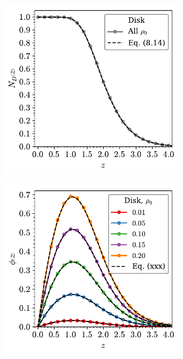 \begin{figure}
     \begin{subfigure}[b]{0.48\textwidth}
         \centering
         \includegraphics[width=\textwidth]{./figures/quasi2d/n_z_3d_disk.pdf}
         \caption{}
         \label{fig:nphic}
     \end{subfigure}
     \hfill
      \begin{subfigure}[b]{0.48\textwidth}
         \centering
         \includegraphics[width=\textwidth]{./figures/quasi2d/phi_z_2d.pdf}
         \caption{}
         \label{fig:nphid}
     \end{subfigure}
     \hfill
     

\end{figure}
